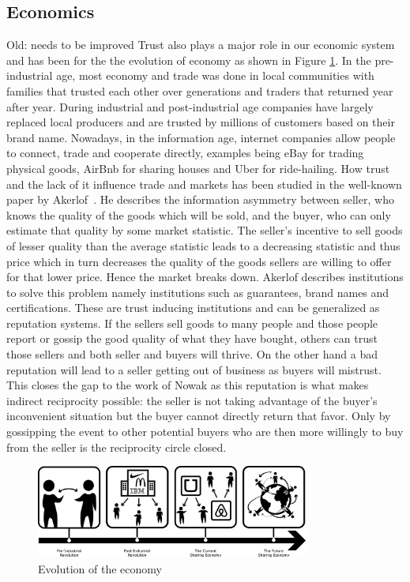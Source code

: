 \subsection{Economics}
{\color{red} Old: needs to be improved}
Trust also plays a major role in our economic system and has been for the the evolution of economy 
as shown in Figure \ref{fig:economy}. In the pre-industrial age, most economy and trade was done in local
communities with families that trusted each other over generations and traders that returned year
after year. During industrial and post-industrial age companies have largely replaced local 
producers and are trusted by millions of customers based on their brand name. Nowadays, in the 
information age, internet companies allow people to connect, trade and cooperate directly, examples
being eBay for trading physical goods, AirBnb for sharing houses and Uber for ride-hailing. How trust
and the lack of it influence trade and markets has been studied in the well-known paper by 
Akerlof~\cite{akerlof1970lemons}. He describes the information asymmetry between seller, who knows
the quality of the goods which will be sold, and the buyer, who can only estimate that quality by 
some market statistic. The seller's incentive to sell goods of lesser quality than the average 
statistic leads to a decreasing statistic and thus price which in turn decreases the quality of the 
goods sellers are willing to offer for that lower price. Hence the market breaks down. Akerlof
describes institutions to solve this problem namely institutions such as guarantees, brand names and
certifications. These are trust inducing institutions and can be generalized as reputation systems.
If the sellers sell goods to many people and those people report or gossip the good quality of what
they have bought, others can trust those sellers and both seller and buyers will thrive. On the 
other hand a bad reputation will lead to a seller getting out of business as buyers will mistrust.
This closes the gap to the work of Nowak as this reputation is what makes indirect reciprocity
possible: the seller is not taking advantage of the buyer's inconvenient situation but the buyer
cannot directly return that favor. Only by gossipping the event to other potential buyers who are 
then more willingly to buy from the seller is the reciprocity circle closed.~\cite{nowak2006five}

\begin{figure}[t]
    \centering
    \includegraphics[width=0.8\textwidth]{images/economy.png}
    \caption{Evolution of the economy}
    \label{fig:economy}
\end{figure}

